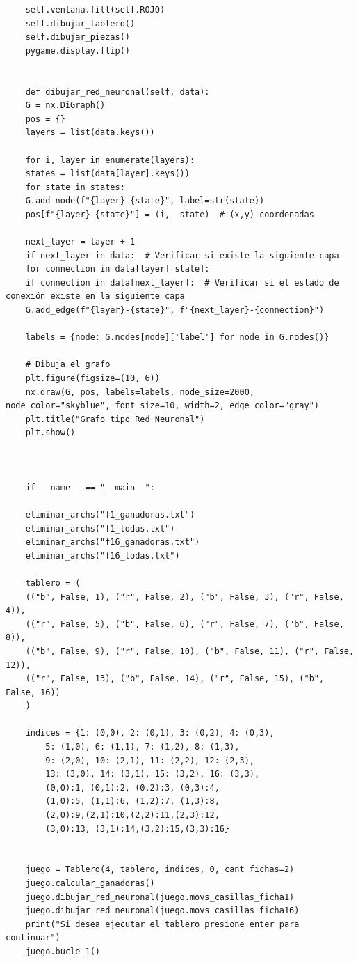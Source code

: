 \documentclass[11pt]{article} %
\begin{document}
\begin{lstlisting}
	self.ventana.fill(self.ROJO)
	self.dibujar_tablero()
	self.dibujar_piezas()
	pygame.display.flip()
	
	
	def dibujar_red_neuronal(self, data):
	G = nx.DiGraph()
	pos = {}
	layers = list(data.keys())
	
	for i, layer in enumerate(layers):
	states = list(data[layer].keys())
	for state in states:
	G.add_node(f"{layer}-{state}", label=str(state))
	pos[f"{layer}-{state}"] = (i, -state)  # (x,y) coordenadas
	
	next_layer = layer + 1
	if next_layer in data:  # Verificar si existe la siguiente capa
	for connection in data[layer][state]:
	if connection in data[next_layer]:  # Verificar si el estado de conexión existe en la siguiente capa
	G.add_edge(f"{layer}-{state}", f"{next_layer}-{connection}")
	
	labels = {node: G.nodes[node]['label'] for node in G.nodes()}
	
	# Dibuja el grafo
	plt.figure(figsize=(10, 6))
	nx.draw(G, pos, labels=labels, node_size=2000, node_color="skyblue", font_size=10, width=2, edge_color="gray")
	plt.title("Grafo tipo Red Neuronal")
	plt.show()
	
	
	
	if __name__ == "__main__":
	
	eliminar_archs("f1_ganadoras.txt")
	eliminar_archs("f1_todas.txt")
	eliminar_archs("f16_ganadoras.txt")
	eliminar_archs("f16_todas.txt")
	
	tablero = (
	(("b", False, 1), ("r", False, 2), ("b", False, 3), ("r", False, 4)),
	(("r", False, 5), ("b", False, 6), ("r", False, 7), ("b", False, 8)),
	(("b", False, 9), ("r", False, 10), ("b", False, 11), ("r", False, 12)),
	(("r", False, 13), ("b", False, 14), ("r", False, 15), ("b", False, 16))
	)
	
	indices = {1: (0,0), 2: (0,1), 3: (0,2), 4: (0,3),
		5: (1,0), 6: (1,1), 7: (1,2), 8: (1,3),
		9: (2,0), 10: (2,1), 11: (2,2), 12: (2,3),
		13: (3,0), 14: (3,1), 15: (3,2), 16: (3,3),
		(0,0):1, (0,1):2, (0,2):3, (0,3):4,
		(1,0):5, (1,1):6, (1,2):7, (1,3):8,
		(2,0):9,(2,1):10,(2,2):11,(2,3):12,
		(3,0):13, (3,1):14,(3,2):15,(3,3):16}
	
	
	juego = Tablero(4, tablero, indices, 0, cant_fichas=2)
	juego.calcular_ganadoras()
	juego.dibujar_red_neuronal(juego.movs_casillas_ficha1)
	juego.dibujar_red_neuronal(juego.movs_casillas_ficha16)
	print("Si desea ejecutar el tablero presione enter para continuar")
	juego.bucle_1()
	
	

		
		
	\end{lstlisting}
	
\end{document}

